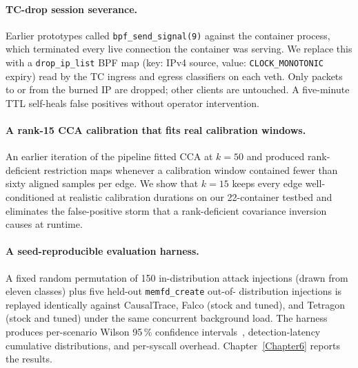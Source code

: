 \paragraph{TC-drop session severance.}
Earlier prototypes called \texttt{bpf\_send\_signal(9)} against the container
process, which terminated every live connection the container was serving.
We replace this with a \texttt{drop\_ip\_list} BPF map (key: IPv4 source,
value: \texttt{CLOCK\_MONOTONIC} expiry) read by the TC ingress and egress
classifiers on each veth. Only packets to or from the burned IP are dropped;
other clients are untouched. A five-minute TTL self-heals false positives
without operator intervention.

\paragraph{A rank-15 CCA calibration that fits real calibration windows.}
An earlier iteration of the pipeline fitted CCA at $k=50$ and produced
rank-deficient restriction maps whenever a calibration window contained
fewer than sixty aligned samples per edge. We show that $k=15$ keeps every
edge well-conditioned at realistic calibration durations on our 22-container
testbed and eliminates the false-positive storm that a rank-deficient
covariance inversion causes at runtime.

\paragraph{A seed-reproducible evaluation harness.}
A fixed random permutation of 150 in-distribution attack injections (drawn
from eleven classes) plus five held-out \texttt{memfd\_create} out-of-
distribution injections is replayed identically against CausalTrace, Falco
(stock and tuned), and Tetragon (stock and tuned) under the same concurrent
background load. The harness produces per-scenario Wilson 95\,\% confidence
intervals~\cite{wilson1927}, detection-latency cumulative distributions, and
per-syscall overhead. Chapter~\ref{Chapter6} reports the results.
